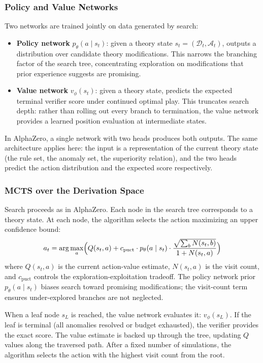 \documentclass{article}
\newcommand{\D}{\mathcal{D}}
\begin{document}
\subsubsection{Policy and Value Networks}

Two networks are trained jointly on data generated by search:

\begin{itemize}[nosep]
    \item \textbf{Policy network} $p_\theta(a \mid s_t)$: given a theory state $s_t = (\D_t, \mathcal{A}_t)$, outputs a distribution over candidate theory modifications. This narrows the branching factor of the search tree, concentrating exploration on modifications that prior experience suggests are promising.
    \item \textbf{Value network} $v_\phi(s_t)$: given a theory state, predicts the expected terminal verifier score under continued optimal play. This truncates search depth: rather than rolling out every branch to termination, the value network provides a learned position evaluation at intermediate states.
\end{itemize}

In AlphaZero, a single network with two heads produces both outputs. The same architecture applies here: the input is a representation of the current theory state (the rule set, the anomaly set, the superiority relation), and the two heads predict the action distribution and the expected score respectively.

\subsubsection{MCTS over the Derivation Space}

Search proceeds as in AlphaZero. Each node in the search tree corresponds to a theory state. At each node, the algorithm selects the action maximizing an upper confidence bound:
\[
    a_t = \arg\max_a \Bigl( Q(s_t, a) + c_{\mathrm{puct}} \cdot p_\theta(a \mid s_t) \cdot \frac{\sqrt{\sum_b N(s_t, b)}}{1 + N(s_t, a)} \Bigr)
\]
where $Q(s_t, a)$ is the current action-value estimate, $N(s_t, a)$ is the visit count, and $c_{\mathrm{puct}}$ controls the exploration-exploitation tradeoff. The policy network prior $p_\theta(a \mid s_t)$ biases search toward promising modifications; the visit-count term ensures under-explored branches are not neglected.

When a leaf node $s_L$ is reached, the value network evaluates it: $v_\phi(s_L)$. If the leaf is terminal (all anomalies resolved or budget exhausted), the verifier provides the exact score. The value estimate is backed up through the tree, updating $Q$ values along the traversed path. After a fixed number of simulations, the algorithm selects the action with the highest visit count from the root.
\end{document}
